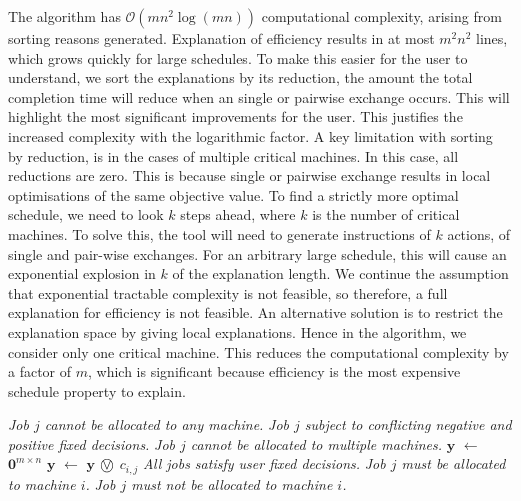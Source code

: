 The algorithm has $\mathcal{O}(mn^2\log(mn))$ computational complexity, arising from sorting reasons generated. Explanation of efficiency results in at most $m^2n^2$ lines, which  grows quickly for large schedules. To make this easier for the user to understand, we sort the explanations by its reduction, the amount the total completion time will reduce when an  single or pairwise exchange occurs. This will highlight the most significant improvements for the user. This justifies the increased complexity with the logarithmic factor.
\linespace
A key limitation with sorting by reduction, is in the cases of multiple critical machines. In this case, all reductions are zero. This is because single or pairwise exchange results in local optimisations of the same objective value. To find a strictly more optimal schedule, we need to look $k$ steps ahead, where $k$ is the number of critical machines. To solve this, the tool will need to generate instructions of $k$ actions, of single and pair-wise exchanges. For an arbitrary large schedule, this will cause an exponential explosion in $k$ of the explanation length. We continue the assumption that exponential tractable complexity is not feasible, so therefore, a full explanation for efficiency is not feasible.
\linespace
An alternative solution is to restrict the explanation space by giving local explanations. Hence in the algorithm, we consider only one critical machine. This reduces the computational complexity by a factor of $m$, which is significant because efficiency is the most expensive schedule property to explain.

\begin{algorithm}[H]
	\caption{}
	\begin{algorithmic}[1]
					\State\emph{Job $j$ cannot be allocated to any machine.}
				\EndIf
					\State\emph{Job $j$ subject to conflicting negative and positive fixed decisions.}
				\EndIf
					\State\emph{Job $j$ cannot be allocated to multiple machines.}	
				\EndIf
			\EndFor
			\State $\mathbf{y}$ $\gets$ $\mathbf{0}^{m\times n}$
					\State $\mathbf{y}$ $\gets$ $\mathbf{y}$ $\incircbin{\lor}$ $c_{i,j}$
				\EndFor
			\EndFor
				\State\emph{All jobs satisfy user fixed decisions.}
			\Else
							\State\emph{Job $j$ must be allocated to machine $i$.}
						\EndIf
							\State\emph{Job $j$ must not be allocated to machine $i$.}
						\EndIf			
					\EndFor
				\EndFor
			\EndIf
		\EndFunction
	\end{algorithmic}
\end{algorithm}


